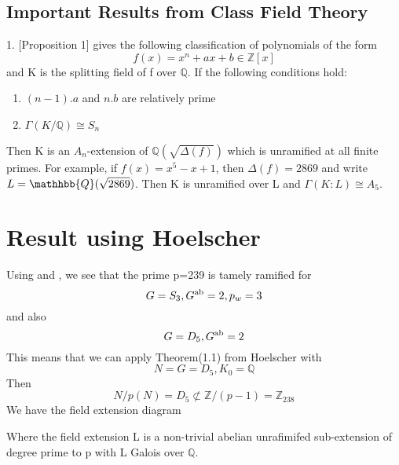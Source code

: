 \documentclass[preprint,12pt,reqno]{elsarticle}
\begin{document}
\subsection{Important Results from Class Field Theory}
1. \cite{YAMA}[Proposition 1] gives the following classification of polynomials of the form 
\begin{equation}
    f(x) = x^n+ax+b \in \mathbb{Z}[x]
\end{equation}and K is the splitting field of f over $\mathbb{Q}$.
If the following conditions hold:
\begin{enumerate}
    \item $(n-1).a$ and $n.b$ are relatively prime 
    \item $\Gamma(K/\mathbb{Q}) \cong S_n$
\end{enumerate}\par
Then K is an $A_n$-extension of $\mathbb{Q}(\sqrt{\Delta(f)})$ which is unramified at all finite primes. For example, if $f(x) = x^5-x+1$, then $\Delta(f)= 2869$ and write $L = \mathhbb{Q}(\sqrt{2869})$. Then K is unramified over L and $\Gamma(K:L)\cong A_5.$

\section{Result using Hoelscher}

Using \cite{HOEL} and \cite{JONE}, we see that 
the prime p=239 is tamely ramified for 
\begin{equation}
  G=S_3,G\textsuperscript{ab} = 2, p_w =3  
\end{equation} and also 
\begin{equation}
    G=D_5,G\textsuperscript{ab} = 2 
\end{equation}
This means that we can apply Theorem(1.1) from Hoelscher with
\begin{equation}
    N = G = D_5, K_0 = \mathbb{Q}
\end{equation}
Then 
\begin{equation}
N/p(N) = D_5 \not\subset \mathbb{Z}/(p-1) = \mathbb{Z}_{238}
\end{equation}
We have the field extension diagram
\begin{center}
    
\end{center}
\par
Where the field extension L is a non-trivial abelian unrafimifed sub-extension of degree prime to p with L Galois over $\mathbb{Q}$.
\end{document}
